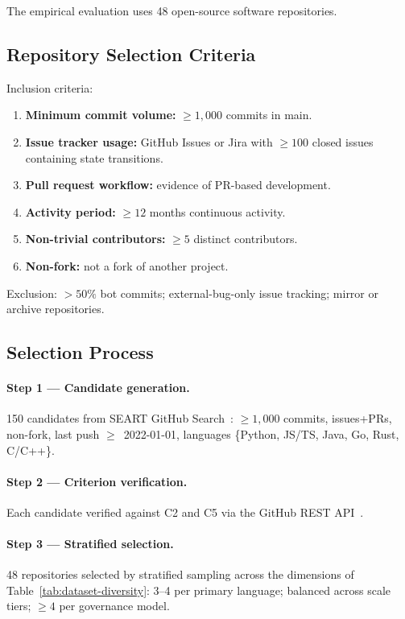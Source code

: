 The empirical evaluation uses 48 open-source software repositories.

\subsection{Repository Selection Criteria}
\label{sec:selection-criteria}

Inclusion criteria:
\begin{enumerate}
    \item \textbf{Minimum commit volume:} $\geq 1{,}000$ commits in main.
    \item \textbf{Issue tracker usage:} GitHub Issues or Jira with
    $\geq 100$ closed issues containing state transitions.
    \item \textbf{Pull request workflow:} evidence of PR-based development.
    \item \textbf{Activity period:} $\geq 12$ months continuous activity.
    \item \textbf{Non-trivial contributors:} $\geq 5$ distinct contributors.
    \item \textbf{Non-fork:} not a fork of another project.
\end{enumerate}

Exclusion: $>50\%$ bot commits; external-bug-only issue tracking; mirror
or archive repositories.


\subsection{Selection Process}
\label{sec:selection-process}

\paragraph{Step 1 — Candidate generation.} 150 candidates from SEART
GitHub Search~\cite{seart2021}: $\geq 1{,}000$ commits, issues+PRs,
non-fork, last push $\geq$~2022-01-01, languages
\{Python, JS/TS, Java, Go, Rust, C/C++\}.

\paragraph{Step 2 — Criterion verification.} Each candidate verified
against C2 and C5 via the GitHub REST API~\cite{github2023api}.

\paragraph{Step 3 — Stratified selection.} 48 repositories selected by
stratified sampling across the dimensions of
Table~\ref{tab:dataset-diversity}: 3--4 per primary language; balanced
across scale tiers; $\geq 4$ per governance model.

